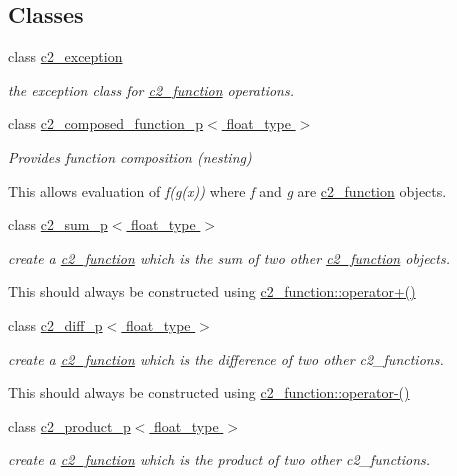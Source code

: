 \subsection*{Classes}
\begin{DoxyCompactItemize}
\item 
class \hyperlink{classc2__exception}{c2\-\_\-exception}
\begin{DoxyCompactList}\small\item\em the exception class for \hyperlink{classc2__function}{c2\-\_\-function} operations. \end{DoxyCompactList}\item 
class \hyperlink{classc2__composed__function__p}{c2\-\_\-composed\-\_\-function\-\_\-p$<$ float\-\_\-type $>$}
\begin{DoxyCompactList}\small\item\em Provides function composition (nesting)

This allows evaluation of {\itshape f(g(x))} where {\itshape f} and {\itshape g} are \hyperlink{classc2__function}{c2\-\_\-function} objects. \end{DoxyCompactList}\item 
class \hyperlink{classc2__sum__p}{c2\-\_\-sum\-\_\-p$<$ float\-\_\-type $>$}
\begin{DoxyCompactList}\small\item\em create a \hyperlink{classc2__function}{c2\-\_\-function} which is the sum of two other \hyperlink{classc2__function}{c2\-\_\-function} objects.

This should always be constructed using \hyperlink{classc2__function_a268b206b47c55e635e5f0a9e0f3e8ded}{c2\-\_\-function\-::operator+()} \end{DoxyCompactList}\item 
class \hyperlink{classc2__diff__p}{c2\-\_\-diff\-\_\-p$<$ float\-\_\-type $>$}
\begin{DoxyCompactList}\small\item\em create a \hyperlink{classc2__function}{c2\-\_\-function} which is the difference of two other c2\-\_\-functions.

This should always be constructed using \hyperlink{classc2__function_a4c56a4673e00bfad37143c403a0c94c8}{c2\-\_\-function\-::operator-\/()} \end{DoxyCompactList}\item 
class \hyperlink{classc2__product__p}{c2\-\_\-product\-\_\-p$<$ float\-\_\-type $>$}
\begin{DoxyCompactList}\small\item\em create a \hyperlink{classc2__function}{c2\-\_\-function} which is the product of two other c2\-\_\-functions.


\end{DoxyCompactList}
\end{DoxyCompactItemize}
